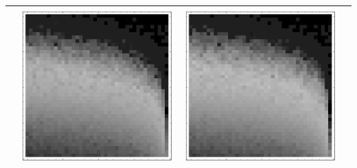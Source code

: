 \documentclass[10pt]{article}
\begin{document}
\begin{tabular}{|c|c|c|c|}
        & \includegraphics[scale=0.25]{plots/simple/LF-20T10T-20T10-CIFAR-2.png}
        & \includegraphics[scale=0.25]{plots/simple/LF-20T10T-20T10-CIFAR-3.png} \\ \hline

\end{tabular}
\end{document}

